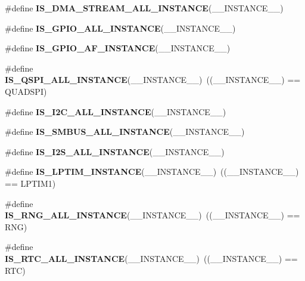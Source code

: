 \begin{DoxyCompactItemize}
\item 
\#define {\bfseries I\+S\+\_\+\+D\+M\+A\+\_\+\+S\+T\+R\+E\+A\+M\+\_\+\+A\+L\+L\+\_\+\+I\+N\+S\+T\+A\+N\+CE}(\+\_\+\+\_\+\+I\+N\+S\+T\+A\+N\+C\+E\+\_\+\+\_\+)
\item 
\#define {\bfseries I\+S\+\_\+\+G\+P\+I\+O\+\_\+\+A\+L\+L\+\_\+\+I\+N\+S\+T\+A\+N\+CE}(\+\_\+\+\_\+\+I\+N\+S\+T\+A\+N\+C\+E\+\_\+\+\_\+)
\item 
\#define {\bfseries I\+S\+\_\+\+G\+P\+I\+O\+\_\+\+A\+F\+\_\+\+I\+N\+S\+T\+A\+N\+CE}(\+\_\+\+\_\+\+I\+N\+S\+T\+A\+N\+C\+E\+\_\+\+\_\+)
\item 
\mbox{\label{group___exported__macros_ga3ddb10b5455f3b1414b3ecd754ef723a}} 
\#define {\bfseries I\+S\+\_\+\+Q\+S\+P\+I\+\_\+\+A\+L\+L\+\_\+\+I\+N\+S\+T\+A\+N\+CE}(\+\_\+\+\_\+\+I\+N\+S\+T\+A\+N\+C\+E\+\_\+\+\_\+)~((\+\_\+\+\_\+\+I\+N\+S\+T\+A\+N\+C\+E\+\_\+\+\_\+) == Q\+U\+A\+D\+S\+PI)
\item 
\#define {\bfseries I\+S\+\_\+\+I2\+C\+\_\+\+A\+L\+L\+\_\+\+I\+N\+S\+T\+A\+N\+CE}(\+\_\+\+\_\+\+I\+N\+S\+T\+A\+N\+C\+E\+\_\+\+\_\+)
\item 
\#define {\bfseries I\+S\+\_\+\+S\+M\+B\+U\+S\+\_\+\+A\+L\+L\+\_\+\+I\+N\+S\+T\+A\+N\+CE}(\+\_\+\+\_\+\+I\+N\+S\+T\+A\+N\+C\+E\+\_\+\+\_\+)
\item 
\#define {\bfseries I\+S\+\_\+\+I2\+S\+\_\+\+A\+L\+L\+\_\+\+I\+N\+S\+T\+A\+N\+CE}(\+\_\+\+\_\+\+I\+N\+S\+T\+A\+N\+C\+E\+\_\+\+\_\+)
\item 
\mbox{\label{group___exported__macros_ga3efb0fd73c5f9fb4325f303d854638e8}} 
\#define {\bfseries I\+S\+\_\+\+L\+P\+T\+I\+M\+\_\+\+I\+N\+S\+T\+A\+N\+CE}(\+\_\+\+\_\+\+I\+N\+S\+T\+A\+N\+C\+E\+\_\+\+\_\+)~((\+\_\+\+\_\+\+I\+N\+S\+T\+A\+N\+C\+E\+\_\+\+\_\+) == L\+P\+T\+I\+M1)
\item 
\mbox{\label{group___exported__macros_gad308a4d36de5051c9dea14459f8e58bd}} 
\#define {\bfseries I\+S\+\_\+\+R\+N\+G\+\_\+\+A\+L\+L\+\_\+\+I\+N\+S\+T\+A\+N\+CE}(\+\_\+\+\_\+\+I\+N\+S\+T\+A\+N\+C\+E\+\_\+\+\_\+)~((\+\_\+\+\_\+\+I\+N\+S\+T\+A\+N\+C\+E\+\_\+\+\_\+) == R\+NG)
\item 
\mbox{\label{group___exported__macros_gacea853c24ec53108fa6611f274f12e2e}} 
\#define {\bfseries I\+S\+\_\+\+R\+T\+C\+\_\+\+A\+L\+L\+\_\+\+I\+N\+S\+T\+A\+N\+CE}(\+\_\+\+\_\+\+I\+N\+S\+T\+A\+N\+C\+E\+\_\+\+\_\+)~((\+\_\+\+\_\+\+I\+N\+S\+T\+A\+N\+C\+E\+\_\+\+\_\+) == R\+TC)

\end{DoxyCompactItemize}
